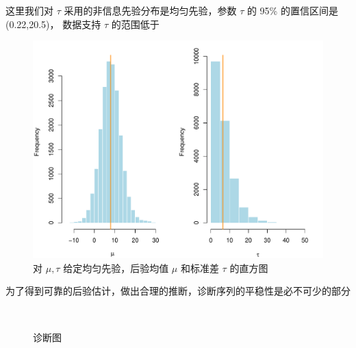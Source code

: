 \documentclass[12pt,a4paper,UTF8,twoside]{book}
\theoremstyle{definition}
\theoremstyle{definition}
\theoremstyle{definition}
\theoremstyle{remark}
\begin{document}
这里我们对 \(\tau\) 采用的非信息先验分布是均匀先验，参数 \(\tau\) 的
95\% 的置信区间是 (0.22,20.5)， 数据支持 \(\tau\) 的范围低于

\begin{figure}

{\centering \includegraphics[width=0.7\linewidth]{figures/posterior_mu_tau} 

}

\caption{对 $\mu,\tau$ 给定均匀先验，后验均值 $\mu$ 和标准差 $\tau$ 的直方图}\label{fig:posterior-mu-tau}
\end{figure}

为了得到可靠的后验估计，做出合理的推断，诊断序列的平稳性是必不可少的部分

\begin{figure}

{\centering {}\\

}

\caption{诊断图}\label{fig:diagnostic}
\end{figure}
\end{document}
